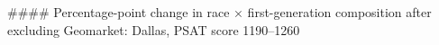 #### Percentage-point change in race × first-generation composition after excluding Geomarket: Dallas, PSAT score 1190–1260
